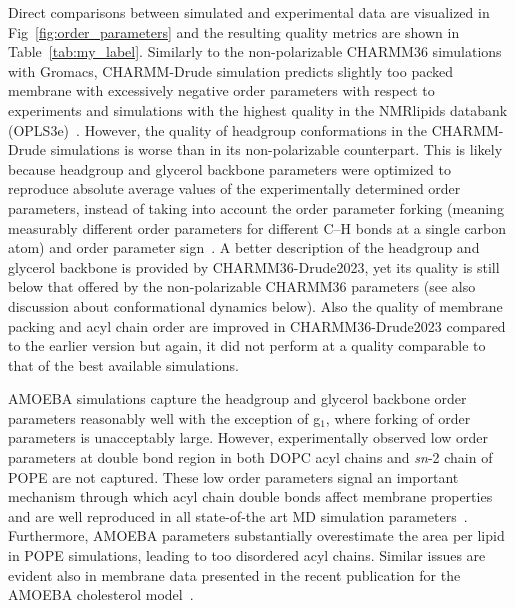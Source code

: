 \documentclass[journal=jacsat,manuscript=article,layout=singlecolumn]{achemso}
\begin{document}
Direct comparisons between simulated and experimental data are visualized in Fig~\ref{fig:order_parameters} and the resulting quality metrics are shown in Table~\ref{tab:my_label}. Similarly to the non-polarizable CHARMM36 simulations with Gromacs, CHARMM-Drude simulation predicts slightly too packed membrane with excessively negative order parameters with respect to experiments and simulations with the highest quality in the NMRlipids databank (OPLS3e)~\cite{Databank}. However,
the quality of headgroup conformations in the CHARMM-Drude simulations is worse than in its non-polarizable counterpart. This is likely because headgroup and glycerol backbone parameters were optimized to reproduce absolute average values of the experimentally determined order parameters, instead of taking into account the order parameter forking (meaning measurably different order parameters for different C--H bonds at a single carbon atom) and order parameter sign~\cite{Antila2022}. A better description of the headgroup and glycerol backbone is provided by CHARMM36-Drude2023, yet its quality is still below that offered by the non-polarizable CHARMM36 parameters (see also discussion about conformational dynamics below). Also the quality of membrane packing and acyl chain order are improved in CHARMM36-Drude2023 compared to the earlier version but again, it did not perform at a quality comparable to that of the best available simulations.

 AMOEBA simulations capture the headgroup and glycerol backbone order parameters reasonably well with the exception of g$_1$,
where forking of order parameters is unacceptably large. However, experimentally observed low order parameters at double bond region in both DOPC acyl chains and {\it sn}-2 chain of POPE are not captured. These low order parameters signal an important mechanism through which acyl chain double bonds affect membrane properties~\cite{ollila07} and are well reproduced in all state-of-the art MD simulation parameters~\cite{ollila16}. Furthermore, AMOEBA parameters substantially overestimate the area per lipid in POPE simulations, leading to too disordered acyl chains. Similar issues are evident also in membrane data presented in the recent publication for the AMOEBA cholesterol model~\cite{Li23chol}.
 
\end{document}
